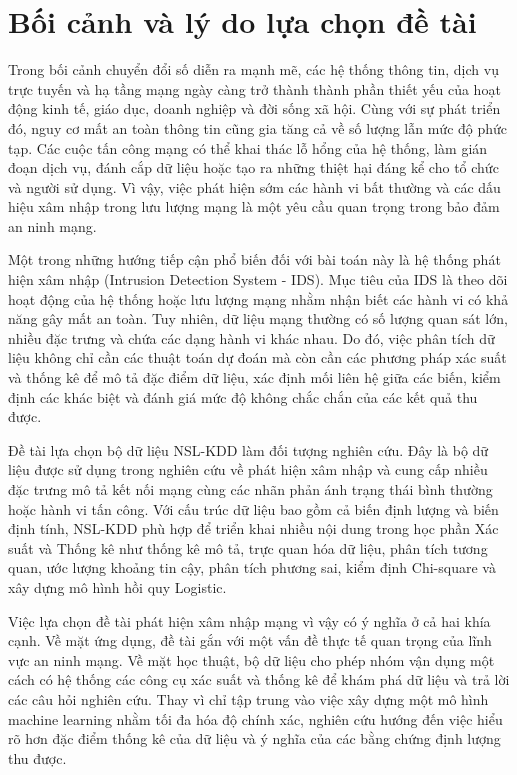 \documentclass[../main.tex]{subfiles}
\begin{document}
\section{Bối cảnh và lý do lựa chọn đề tài}

Trong bối cảnh chuyển đổi số diễn ra mạnh mẽ, các hệ thống thông tin, dịch vụ trực tuyến và hạ tầng mạng ngày càng trở thành thành phần thiết yếu của hoạt động kinh tế, giáo dục, doanh nghiệp và đời sống xã hội. Cùng với sự phát triển đó, nguy cơ mất an toàn thông tin cũng gia tăng cả về số lượng lẫn mức độ phức tạp. Các cuộc tấn công mạng có thể khai thác lỗ hổng của hệ thống, làm gián đoạn dịch vụ, đánh cắp dữ liệu hoặc tạo ra những thiệt hại đáng kể cho tổ chức và người sử dụng. Vì vậy, việc phát hiện sớm các hành vi bất thường và các dấu hiệu xâm nhập trong lưu lượng mạng là một yêu cầu quan trọng trong bảo đảm an ninh mạng.

Một trong những hướng tiếp cận phổ biến đối với bài toán này là hệ thống phát hiện xâm nhập (Intrusion Detection System - IDS). Mục tiêu của IDS là theo dõi hoạt động của hệ thống hoặc lưu lượng mạng nhằm nhận biết các hành vi có khả năng gây mất an toàn. Tuy nhiên, dữ liệu mạng thường có số lượng quan sát lớn, nhiều đặc trưng và chứa các dạng hành vi khác nhau. Do đó, việc phân tích dữ liệu không chỉ cần các thuật toán dự đoán mà còn cần các phương pháp xác suất và thống kê để mô tả đặc điểm dữ liệu, xác định mối liên hệ giữa các biến, kiểm định các khác biệt và đánh giá mức độ không chắc chắn của các kết quả thu được.

Đề tài lựa chọn bộ dữ liệu NSL-KDD làm đối tượng nghiên cứu. Đây là bộ dữ liệu được sử dụng trong nghiên cứu về phát hiện xâm nhập và cung cấp nhiều đặc trưng mô tả kết nối mạng cùng các nhãn phản ánh trạng thái bình thường hoặc hành vi tấn công. Với cấu trúc dữ liệu bao gồm cả biến định lượng và biến định tính, NSL-KDD phù hợp để triển khai nhiều nội dung trong học phần Xác suất và Thống kê như thống kê mô tả, trực quan hóa dữ liệu, phân tích tương quan, ước lượng khoảng tin cậy, phân tích phương sai, kiểm định Chi-square và xây dựng mô hình hồi quy Logistic.

Việc lựa chọn đề tài phát hiện xâm nhập mạng vì vậy có ý nghĩa ở cả hai khía cạnh. Về mặt ứng dụng, đề tài gắn với một vấn đề thực tế quan trọng của lĩnh vực an ninh mạng. Về mặt học thuật, bộ dữ liệu cho phép nhóm vận dụng một cách có hệ thống các công cụ xác suất và thống kê để khám phá dữ liệu và trả lời các câu hỏi nghiên cứu. Thay vì chỉ tập trung vào việc xây dựng một mô hình machine learning nhằm tối đa hóa độ chính xác, nghiên cứu hướng đến việc hiểu rõ hơn đặc điểm thống kê của dữ liệu và ý nghĩa của các bằng chứng định lượng thu được.
\end{document}
